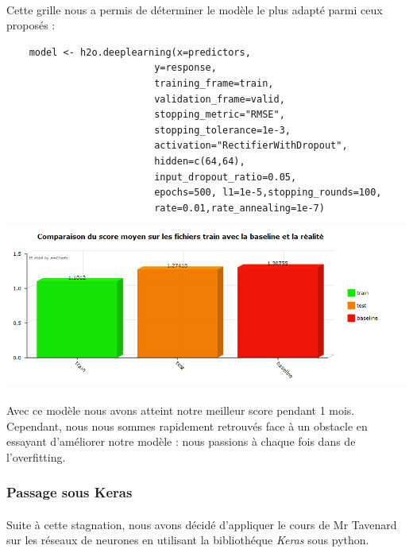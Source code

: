 \documentclass[14pt, openany]{article}
\begin{document}
\paragraph{}
Cette grille nous a permis de déterminer le modèle le plus adapté parmi ceux proposés :

\begin{verbatim}
    model <- h2o.deeplearning(x=predictors, 
                          y=response,
                          training_frame=train,
                          validation_frame=valid,
                          stopping_metric="RMSE",
                          stopping_tolerance=1e-3,
                          activation="RectifierWithDropout",
                          hidden=c(64,64),
                          input_dropout_ratio=0.05,
                          epochs=500, l1=1e-5,stopping_rounds=100,
                          rate=0.01,rate_annealing=1e-7)
\end{verbatim}

\begin{center}
\includegraphics[scale=0.7]{Images/deeph2o.png}
\end{center}


\paragraph{}
Avec ce modèle nous avons atteint notre meilleur score pendant 1 mois. Cependant, nous nous sommes rapidement retrouvés face à un obstacle en essayant d'améliorer notre modèle : nous passions à chaque fois dans de l'overfitting.

\subsubsection{Passage sous Keras}

\paragraph{}
Suite à cette stagnation, nous avons décidé d'appliquer le cours de Mr Tavenard sur les réseaux de neurones en utilisant la bibliothéque \textit{Keras} sous python.
\end{document}
